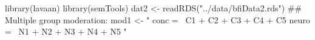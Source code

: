\begin{Schunk}
\begin{Sinput}
 library(lavaan)
 library(semTools)
 dat2 <- readRDS("../data/bfiData2.rds")
 ## Multiple group moderation:
 mod1 <- "
 conc =~ C1 + C2 + C3 + C4 + C5
 neuro =~ N1 + N2 + N3 + N4 + N5
 "
\end{Sinput}
\end{Schunk}
